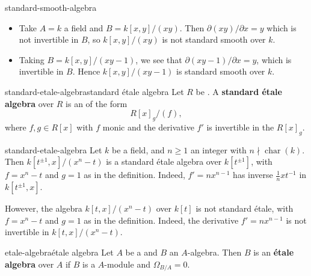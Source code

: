 \begin{example}{standard-smooth-algebra}
    \begin{itemize}
        \item Take $A = k$ a field and $B = k[x, y] / (xy)$. Then $\partial (xy) / \partial x = y$ which is not invertible in $B$, so $k[x, y] / (xy)$ is not standard smooth over $k$.
        \item Taking $B = k[x, y] / (xy - 1)$, we see that $\partial (xy - 1) / \partial x = y$, which is invertible in $B$. Hence $k[x, y] / (xy - 1)$ is standard smooth over $k$.
    \end{itemize}
\end{example}

\begin{topic}{standard-etale-algebra}{standard étale algebra}
    Let $R$ be . A \textbf{standard étale algebra} over $R$ is an  of the form
    \[ R[x]_g / (f) , \]
    where $f, g \in R[x]$ with $f$ monic and the derivative $f'$ is invertible in the  $R[x]_g$.
\end{topic}

\begin{example}{standard-etale-algebra}
    Let $k$ be a field, and $n \ge 1$ an integer with $n \nmid \operatorname{char}(k)$. Then $k[t^{\pm 1}, x] / (x^n - t)$ is a standard étale algebra over $k[t^{\pm 1}]$, with $f = x^n - t$ and $g = 1$ as in the definition. Indeed, $f' = n x^{n - 1}$ has inverse $\tfrac{1}{n} x t^{-1}$ in $k[t^{\pm 1}, x]$.
    
    However, the algebra $k[t, x] / (x^n - t)$ over $k[t]$ is not standard étale, with $f = x^n - t$ and $g = 1$ as in the definition. Indeed, the derivative $f' = n x^{n - 1}$ is not invertible in $k[t, x] / (x^n - t)$.
\end{example}

\begin{topic}{etale-algebra}{étale algebra}
    Let $A$ be a  and $B$ an $A$-algebra. Then $B$ is an \textbf{étale algebra} over $A$ if $B$ is a  $A$-module and $\Omega_{B/A} = 0$.
\end{topic}

